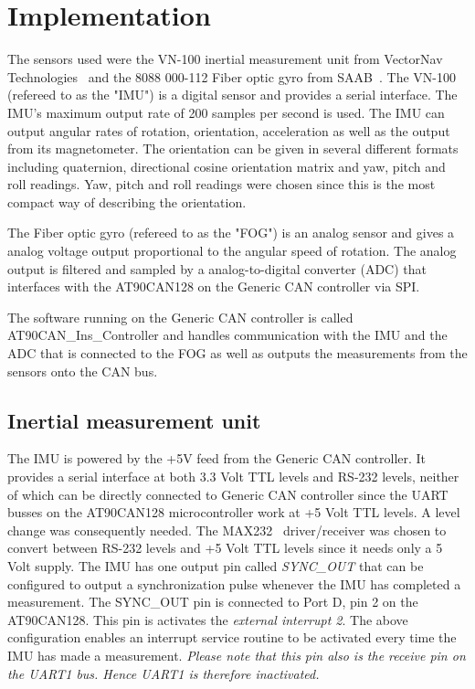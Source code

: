
\section{Implementation}\label{sec:implementation}
The sensors used were the VN-100 inertial measurement unit from VectorNav Technologies~\cite{web:vn100} and the 8088 000-112 Fiber optic gyro from SAAB~\cite{web:fog1}. The VN-100 (refereed to as the "IMU") is a digital sensor and provides a serial interface. The IMU's  maximum output rate of 200 samples per second is used. The IMU can output angular rates of rotation, orientation, acceleration as well as the output from its magnetometer. The orientation can be given in several different formats including quaternion, directional cosine orientation matrix and yaw, pitch and roll readings. Yaw, pitch and roll readings were chosen since this is the most compact way of describing the orientation.

The Fiber optic gyro (refereed to as the "FOG") is an analog sensor and gives a analog voltage output proportional to the angular speed of rotation. The analog output is filtered and sampled by a analog-to-digital converter (ADC) that interfaces with the AT90CAN128 on the Generic CAN controller via SPI.

The software running on the Generic CAN controller is called AT90CAN\_Ins\_Controller and handles communication with the IMU and the ADC that is connected to the FOG as well as outputs the measurements from the sensors onto the CAN bus.

\subsection{Inertial measurement unit}
The IMU is powered by the +5V feed from the Generic CAN controller. It provides a serial interface at both 3.3 Volt TTL levels and RS-232 levels, neither of which can be directly connected to Generic CAN controller since the UART busses on the AT90CAN128 microcontroller work at +5 Volt TTL levels. A level change was consequently needed. The MAX232~\cite{web:max232} driver/receiver was chosen to convert between RS-232 levels and +5 Volt TTL levels since it needs only a 5 Volt supply. \newline
The IMU has one output pin called \emph{SYNC\_OUT} that can be configured to output a synchronization pulse whenever the IMU has completed a measurement. The SYNC\_OUT pin is connected to Port D, pin 2 on the AT90CAN128. This pin is activates the \emph{external interrupt 2}. \newline
The above configuration enables an interrupt service routine to be activated every time the IMU has made a measurement.\newline 
\emph{Please note that this pin also is the receive pin on the UART1 bus. Hence UART1 is therefore inactivated.} 

